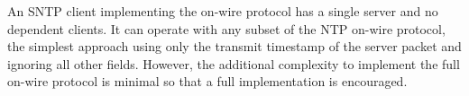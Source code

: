 An SNTP client implementing the on-wire protocol has a single server
and no dependent clients. It can operate with any subset of the NTP
on-wire protocol, the simplest approach using only the transmit
timestamp of the server packet and ignoring all other fields.
However, the additional complexity to implement the full on-wire
protocol is minimal so that a full implementation is encouraged.
